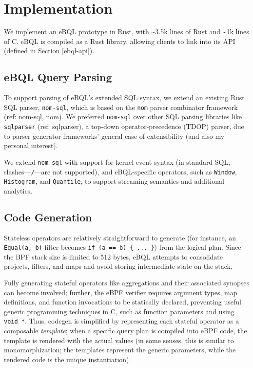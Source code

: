 \section{Implementation}

We implement an eBQL prototype in Rust, with \textasciitilde{}3.5k lines of Rust and
\textasciitilde{}1k lines of C. eBQL is compiled as a Rust library, allowing clients to link into
its API (defined in Section \ref{ebql-api}).

\subsection{eBQL Query Parsing}

To support parsing of eBQL's extended SQL syntax, we extend an existing Rust SQL parser,
\texttt{nom-sql}, which is based on the \texttt{nom} parser combinator framework (ref: nom-sql,
nom). We preferred \texttt{nom-sql} over other SQL parsing libraries like \texttt{sqlparser} (ref:
sqlparser), a top-down operator-precedence (TDOP) parser, due to parser generator frameworks'
general ease of extensibility (and also my personal interest).

We extend \texttt{nom-sql} with support for kernel event syntax (in standard SQL,
slashes---\texttt{/}---are not supported), and eBQL-specific operators, such as \texttt{Window},
\texttt{Histogram}, and \texttt{Quantile}, to support streaming semantics and additional analytics.

\subsection{Code Generation}
\label{impl-codegen}

Stateless operators are relatively straightforward to generate (for instance, an \texttt{Equal(a,
b)} filter becomes \texttt{if (a == b) \{ ... \}}) from the logical plan. Since the BPF stack size
is limited to 512 bytes, eBQL attempts to consolidate projects, filters, and maps and avoid storing
intermediate state on the stack.

Fully generating stateful operators like aggregations and their associated synopses can become
involved; further, the eBPF verifier requires argument types, map definitions, and function
invocations to be statically declared, preventing useful generic programming techniques in C, such
as function parameters and using \texttt{void *}. Thus, codegen is simplified by representing each
stateful operator as a composable \textit{template}; when a specific query plan is compiled into
eBPF code, the template is rendered with the actual values (in some senses, this is similar to
monomorphization; the templates represent the generic parameters, while the rendered code is the
unique instantiation).


